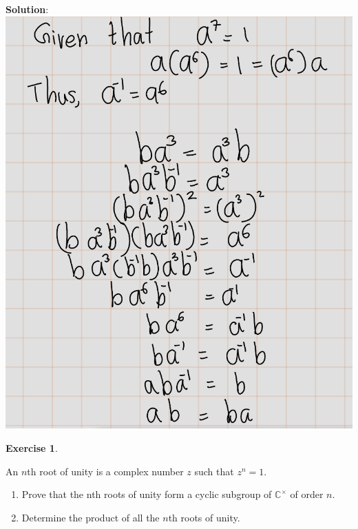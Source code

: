 \documentclass[
]{book}
\providecommand{\tightlist}{%
  \setlength{\itemsep}{0pt}\setlength{\parskip}{0pt}}
\theoremstyle{definition}
\theoremstyle{definition}
\theoremstyle{definition}
\newtheorem{exercise}{Exercise}[chapter]
\theoremstyle{definition}
\theoremstyle{remark}
\begin{document}
\textbf{Solution}:
\includegraphics{figures/ch_2/fig22.png}

\begin{exercise}
\protect\hypertarget{exr:unnamed-chunk-57}{}\label{exr:unnamed-chunk-57}

An \(n\)th root of unity is a complex number \(z\) such that \(z^n = 1\).

\begin{enumerate}
\def\labelenumi{(\alph{enumi})}
\tightlist
\item
  Prove that the nth roots of unity form a cyclic subgroup of \(\mathbb{C}^\times\) of order \(n\).
\item
  Determine the product of all the \(n\)th roots of unity.
\end{enumerate}

\end{exercise}
\end{document}
